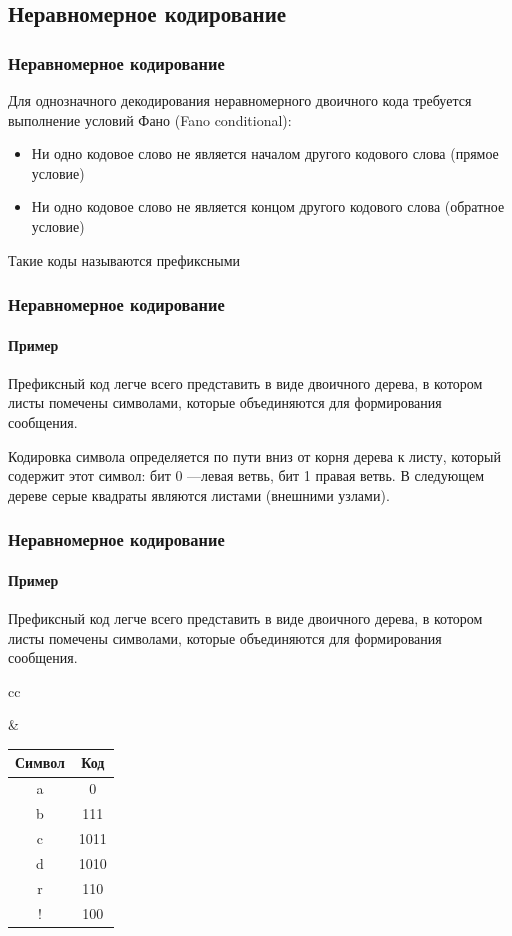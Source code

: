  \subsection{Неравномерное кодирование}
\begin{frame}
\frametitle{Неравномерное кодирование}
Для однозначного декодирования неравномерного двоичного кода требуется выполнение условий Фано (Fano conditional):
\begin{itemize}
	\item Ни одно кодовое слово не является началом другого кодового слова (прямое условие)
\item Ни одно кодовое слово не является концом другого кодового слова (обратное условие)
\end{itemize}

Такие коды называются префиксными

\end{frame}
\begin{frame}
\frametitle{Неравномерное кодирование}
\framesubtitle{Пример}

Префиксный код легче всего представить в виде двоичного дерева, в котором  листы помечены  символами, которые объединяются для формирования сообщения. 

Кодировка символа определяется по пути вниз от корня дерева к листу, который содержит этот символ: 
бит 0 ---левая ветвь, бит 1 правая ветвь. В следующем дереве серые квадраты являются листами (внешними узлами). 

\end{frame}

\begin{frame}
\frametitle{Неравномерное кодирование}
\framesubtitle{Пример}

Префиксный код легче всего представить в виде двоичного дерева, в котором  листы помечены  символами, которые объединяются для формирования сообщения. 

\begin{tabular}{cc}

 \pause & %
\begin{tabular}{|c|c|}
\hline 
Символ & Код\tabularnewline
\hline 
a & 0\tabularnewline
\hline 
b & 111\tabularnewline
\hline 
c & 1011\tabularnewline
\hline 
d & 1010\tabularnewline
\hline 
r & 110\tabularnewline
\hline 
! & 100\tabularnewline
\hline 
\end{tabular}\tabularnewline

\end{tabular}

\end{frame}

